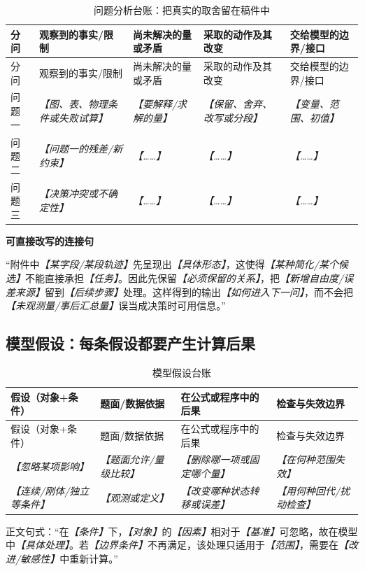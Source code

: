 \documentclass[UTF8,zihao=-4]{ctexart}
\newcommand{\slot}[1]{\textcolor{inkblue}{\textit{【#1】}}}
\newcommand{\guidehead}[1]{\par\medskip\noindent\textbf{\color{inkblue}#1}\par}
\begin{document}
\begin{longtable}{p{2.0cm}p{3.5cm}p{3.4cm}p{3.3cm}p{3.4cm}}
\caption{问题分析台账：把真实的取舍留在稿件中}\label{tab:template-analysis-ledger}\\
\toprule
分问 & 观察到的事实/限制 & 尚未解决的量或矛盾 & 采取的动作及其改变 & 交给模型的边界/接口\\
\midrule
\endfirsthead
\toprule
分问 & 观察到的事实/限制 & 尚未解决的量或矛盾 & 采取的动作及其改变 & 交给模型的边界/接口\\
\midrule
\endhead
问题一 & \slot{图、表、物理条件或失败试算} & \slot{要解释/求解的量} & \slot{保留、舍弃、改写或分段} & \slot{变量、范围、初值}\\
问题二 & \slot{问题一的残差/新约束} & \slot{……} & \slot{……} & \slot{……}\\
问题三 & \slot{决策冲突或不确定性} & \slot{……} & \slot{……} & \slot{……}\\
\bottomrule
\end{longtable}

\guidehead{可直接改写的连接句}“附件中\slot{某字段/某段轨迹}先呈现出\slot{具体形态}，这使得\slot{某种简化/某个候选}不能直接承担\slot{任务}。因此先保留\slot{必须保留的关系}，把\slot{新增自由度/误差来源}留到\slot{后续步骤}处理。这样得到的输出\slot{如何进入下一问}，而不会把\slot{未观测量/事后汇总量}误当成决策时可用信息。”

\subsection{模型假设：每条假设都要产生计算后果}

\begin{longtable}{p{3.2cm}p{3.1cm}p{4.0cm}p{3.6cm}}
\caption{模型假设台账}\label{tab:template-assumption-ledger}\\
\toprule
假设（对象+条件） & 题面/数据依据 & 在公式或程序中的后果 & 检查与失效边界\\
\midrule
\endfirsthead
\toprule
假设（对象+条件） & 题面/数据依据 & 在公式或程序中的后果 & 检查与失效边界\\
\midrule
\endhead
\slot{忽略某项影响} & \slot{题面允许/量级比较} & \slot{删除哪一项或固定哪个量} & \slot{在何种范围失效}\\
\slot{连续/刚体/独立等条件} & \slot{观测或定义} & \slot{改变哪种状态转移或误差} & \slot{用何种回代/扰动检查}\\
\bottomrule
\end{longtable}

正文句式：“在\slot{条件}下，\slot{对象}的\slot{因素}相对于\slot{基准}可忽略，故在模型中\slot{具体处理}。若\slot{边界条件}不再满足，该处理只适用于\slot{范围}，需要在\slot{改进/敏感性}中重新计算。”
\end{document}

